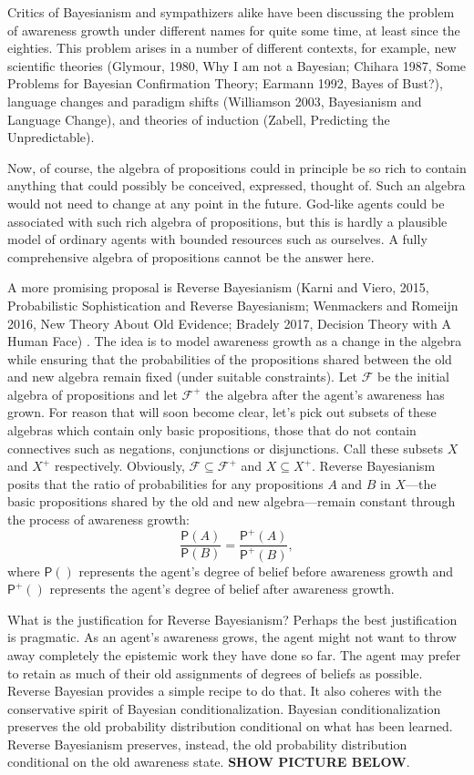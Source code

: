 \documentclass[
  11pt,
  dvipsnames,enabledeprecatedfontcommands]{scrartcl}
\newcommand{\pr}[1]{\ensuremath{\mathsf{P}(#1)}}
\newcommand{\ppr}[2]{\ensuremath{\mathsf{P}^{#1}(#2)}}
\begin{document}
Critics of Bayesianism and sympathizers alike have been discussing the
problem of awareness growth under different names for quite some time,
at least since the eighties. This problem arises in a number of
different contexts, for example, new scientific theories (Glymour, 1980,
Why I am not a Bayesian; Chihara 1987, Some Problems for Bayesian
Confirmation Theory; Earmann 1992, Bayes of Bust?), language changes and
paradigm shifts (Williamson 2003, Bayesianism and Language Change), and
theories of induction (Zabell, Predicting the Unpredictable).

Now, of course, the algebra of propositions could in principle be so
rich to contain anything that could possibly be conceived, expressed,
thought of. Such an algebra would not need to change at any point in the
future. God-like agents could be associated with such rich algebra of
propositions, but this is hardly a plausible model of ordinary agents
with bounded resources such as ourselves. A fully comprehensive algebra
of propositions cannot be the answer here.

A more promising proposal is Reverse Bayesianism (Karni and Viero, 2015,
Probabilistic Sophistication and Reverse Bayesianism; Wenmackers and
Romeijn 2016, New Theory About Old Evidence; Bradely 2017, Decision
Theory with A Human Face) . The idea is to model awareness growth as a
change in the algebra while ensuring that the probabilities of the
propositions shared between the old and new algebra remain fixed (under
suitable constraints). Let \(\mathcal{F}\) be the initial algebra of
propositions and let \(\mathcal{F}^+\) the algebra after the agent's
awareness has grown. For reason that will soon become clear, let's pick
out subsets of these algebras which contain only basic propositions,
those that do not contain connectives such as negations, conjunctions or
disjunctions. Call these subsets \(X\) and \(X^+\) respectively.
Obviously, \(\mathcal{F}\subseteq \mathcal{F}^+\) and
\(X\subseteq X^+\). Reverse Bayesianism posits that the ratio of
probabilities for any propositions \(A\) and \(B\) in \(X\)---the basic
propositions shared by the old and new algebra---remain constant through
the process of awareness growth:
\[\frac{\pr{A}}{\pr{B}} = \frac{\ppr{+}{A}}{\ppr{+}{B}},\] where
\(\pr{}\) represents the agent's degree of belief before awareness
growth and \(\ppr{+}{}\) represents the agent's degree of belief after
awareness growth.

What is the justification for Reverse Bayesianism? Perhaps the best
justification is pragmatic. As an agent's awareness grows, the agent
might not want to throw away completely the epistemic work they have
done so far. The agent may prefer to retain as much of their old
assignments of degrees of beliefs as possible. Reverse Bayesian provides
a simple recipe to do that. It also coheres with the conservative spirit
of Bayesian conditionalization. Bayesian conditionalization preserves
the old probability distribution conditional on what has been learned.
Reverse Bayesianism preserves, instead, the old probability distribution
conditional on the old awareness state. \textbf{SHOW PICTURE BELOW}.
\end{document}
